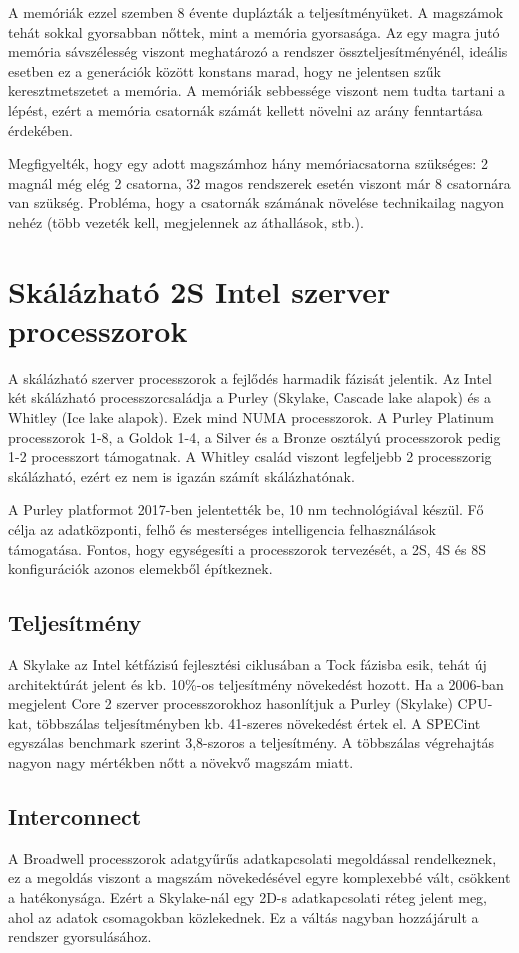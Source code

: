 A memóriák ezzel szemben 8 évente duplázták a teljesítményüket.
A magszámok tehát sokkal gyorsabban nőttek, mint a memória gyorsasága.
Az egy magra jutó memória sávszélesség viszont meghatározó a rendszer összteljesítményénél, ideális esetben ez a generációk között konstans marad, hogy ne jelentsen szűk keresztmetszetet a memória.
A memóriák sebbessége viszont nem tudta tartani a lépést, ezért a memória csatornák számát kellett növelni az arány fenntartása érdekében.

Megfigyelték, hogy egy adott magszámhoz hány memóriacsatorna szükséges: 2 magnál még elég 2 csatorna, 32 magos rendszerek esetén viszont már 8 csatornára van szükség.
Probléma, hogy a csatornák számának növelése technikailag nagyon nehéz (több vezeték kell, megjelennek az áthallások, stb.).

\section{Skálázható 2S Intel szerver processzorok}
A skálázható szerver processzorok a fejlődés harmadik fázisát jelentik.
Az Intel két skálázható processzorcsaládja a Purley (Skylake, Cascade lake alapok) és a Whitley (Ice lake alapok).
Ezek mind NUMA processzorok.
A Purley Platinum processzorok 1-8, a Goldok 1-4, a Silver és a Bronze osztályú processzorok pedig 1-2 processzort támogatnak.
A Whitley család viszont legfeljebb 2 processzorig skálázható, ezért ez nem is igazán számít skálázhatónak.

A Purley platformot 2017-ben jelentették be, 10 nm technológiával készül.
Fő célja az adatközponti, felhő és mesterséges intelligencia felhasználások támogatása.
Fontos, hogy egységesíti a processzorok tervezését, a 2S, 4S és 8S konfigurációk azonos elemekből építkeznek.

\subsection{Teljesítmény}
A Skylake az Intel kétfázisú fejlesztési ciklusában a Tock fázisba esik, tehát új architektúrát jelent és kb. 10\%-os teljesítmény növekedést hozott.
Ha a 2006-ban megjelent Core 2 szerver processzorokhoz hasonlítjuk a Purley (Skylake) CPU-kat, többszálas teljesítményben kb. 41-szeres növekedést értek el.
A SPECint egyszálas benchmark szerint 3,8-szoros a teljesítmény.
A többszálas végrehajtás nagyon nagy mértékben nőtt a növekvő magszám miatt.

\subsection{Interconnect}
A Broadwell processzorok adatgyűrűs adatkapcsolati megoldással rendelkeznek, ez a megoldás viszont a magszám növekedésével egyre komplexebbé vált, csökkent a hatékonysága.
Ezért a Skylake-nál egy 2D-s adatkapcsolati réteg jelent meg, ahol az adatok csomagokban közlekednek.
Ez a váltás nagyban hozzájárult a rendszer gyorsulásához.

